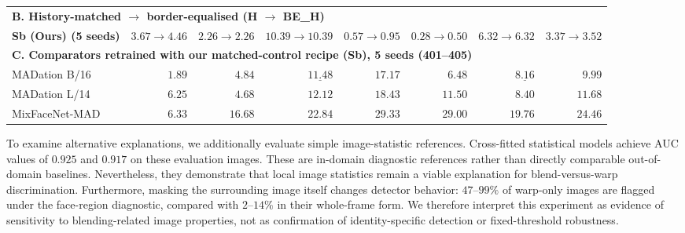 \begin{table}[t]
\begin{tabular}{lrrrrrrr}
    \midrule
    \multicolumn{8}{l}{\textbf{B. History-matched $\rightarrow$ border-equalised (H $\rightarrow$ BE\_H)}} \\
   \textbf{ Sb (Ours) (5 seeds)} & $3.67\!\to\!4.46$ & $2.26\!\to\!2.26$ & $10.39\!\to\!10.39$ & $0.57\!\to\!0.95$ & $0.28\!\to\!0.50$ & $6.32\!\to\!6.32$ & $3.37\!\to\!3.52$ \\
    \midrule
    \multicolumn{8}{l}{\textbf{C. Comparators retrained with our matched-control recipe (Sb), 5 seeds (401--405)}} \\
    MADation B/16 & $1.89$ & $4.84$ & $\underline{11.48}$ & $17.17$ & $6.48$ & $\underline{8.16}$ & $9.99$ \\
    MADation L/14 & $6.25$ & $4.68$ & $12.12$ & $18.43$ & $11.50$ & $8.40$ & $11.68$ \\
    MixFaceNet-MAD & $6.33$ & $16.68$ & $22.84$ & $29.33$ & $29.00$ & $19.76$ & $24.46$ \\
    \bottomrule
    \end{tabular}
    \par\smallskip\raggedright
    
    
    
    
    
    \end{table}
    

To examine alternative explanations, we additionally
evaluate simple image-statistic references.
Cross-fitted statistical models achieve AUC values
of $0.925$ and $0.917$ on these evaluation images.
These are in-domain diagnostic references rather than
directly comparable out-of-domain baselines.
Nevertheless, they demonstrate that local image
statistics remain a viable explanation for
blend-versus-warp discrimination.
Furthermore, masking the surrounding image itself
changes detector behavior: $47$--$99\%$ of
warp-only images are flagged under the face-region
diagnostic, compared with $2$--$14\%$ in their
whole-frame form.
We therefore interpret this experiment as evidence
of sensitivity to blending-related image properties,
not as confirmation of identity-specific detection
or fixed-threshold robustness.

